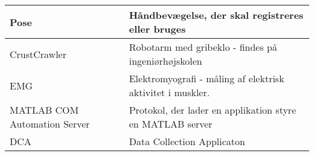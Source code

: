 \begin{tabular}{p{90pt}p{240pt}}
	Pose & Håndbevægelse, der skal registreres eller bruges\\ \hline
	CrustCrawler & Robotarm med gribeklo - findes på ingeniørhøjskolen\\ \hline
	EMG & Elektromyografi - måling af elektrisk aktivitet i muskler.\\ \hline
	MATLAB COM Automation Server & Protokol, der lader en applikation styre en MATLAB server\citep{RefWorks:5}\\ \hline
	DCA & Data Collection Applicaton\\
\end{tabular}
